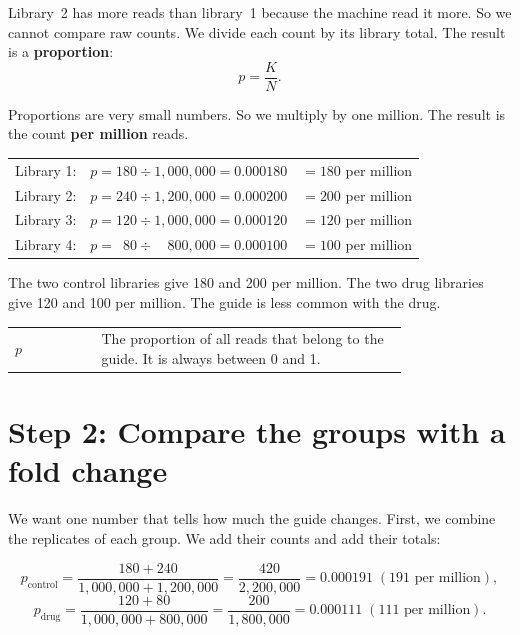 Library~2 has more reads than library~1 because the machine read it more.
So we cannot compare raw counts. We divide each count by its library total.
The result is a \textbf{proportion}:
\[
p = \frac{K}{N}.
\]

Proportions are very small numbers. So we multiply by one million. The
result is the count \textbf{per million} reads.

\begin{worked}[ 1: proportions]
\begin{tabular}{@{}lll@{}}
Library 1: & $p = 180 \div 1{,}000{,}000 = 0.000180$ & $= 180$ per million\\
Library 2: & $p = 240 \div 1{,}200{,}000 = 0.000200$ & $= 200$ per million\\
Library 3: & $p = 120 \div 1{,}000{,}000 = 0.000120$ & $= 120$ per million\\
Library 4: & $p = \phantom{0}80 \div \phantom{0,}800{,}000 = 0.000100$ & $= 100$ per million\\
\end{tabular}

\smallskip
The two control libraries give 180 and 200 per million. The two drug
libraries give 120 and 100 per million. The guide is less common with the
drug.
\end{worked}

\begin{symbols}
\begin{tabular}{@{}l p{0.78\linewidth}@{}}
$p$ & The proportion of all reads that belong to the guide. It is always
      between 0 and 1.\\
\end{tabular}
\end{symbols}

\section{Step 2: Compare the groups with a fold change}

We want one number that tells how much the guide changes. First, we combine
the replicates of each group. We add their counts and add their totals:

\[
p_{\text{control}} = \frac{180+240}{1{,}000{,}000+1{,}200{,}000}
 = \frac{420}{2{,}200{,}000} = 0.000191 \;(191 \text{ per million}),
\]
\[
p_{\text{drug}} = \frac{120+80}{1{,}000{,}000+800{,}000}
 = \frac{200}{1{,}800{,}000} = 0.000111 \;(111 \text{ per million}).
\]

